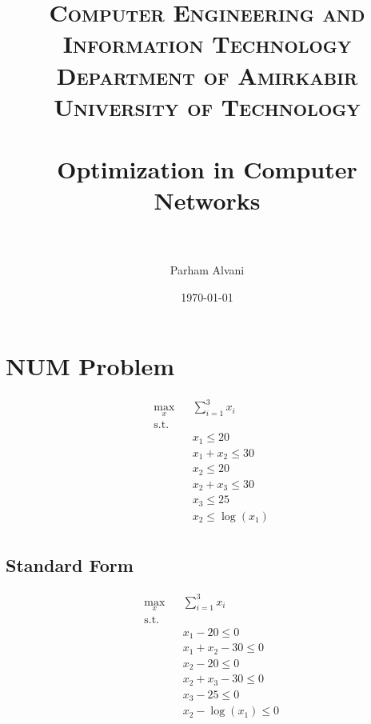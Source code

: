 \documentclass[paper=a4, fontsize=11pt]{scrartcl} %
\title{	
	\normalfont\normalsize
	\textsc{Computer Engineering and Information Technology Department of Amirkabir University of Technology} \\ [25pt] %
	\horrule{0.5pt} \\[0.4cm] %
	\huge Optimization in Computer Networks \\ %
	\horrule{2pt} \\[0.5cm] %
}
\author{Parham Alvani} %
\date{\normalsize\today} %
\numberwithin{equation}{section} %
\numberwithin{figure}{section} %
\numberwithin{table}{section} %
\begin{document}
\maketitle %


\section{NUM Problem}

\begin{equation}
	\begin{aligned}
		& \underset{x}{\text{max}}
		& & \sum_{i=1}^{3} x_i \\
		& \text{s.t.} \\
		& & & x_1 \le 20 \\
		& & & x_1 + x_2 \le 30 \\
		& & & x_2 \le 20 \\
		& & & x_2 + x_3 \le 30 \\
		& & & x_3 \le 25 \\
		& & & x_2 \le \log(x_1) \\
	\end{aligned}					
\end{equation}


\subsection{Standard Form}

\begin{equation}
	\begin{aligned}
		& \underset{x}{\text{max}}
		& & \sum_{i=1}^{3} x_i \\
		& \text{s.t.} \\
		& & & x_1 - 20 \le 0 \\
		& & & x_1 + x_2 - 30 \le 0 \\
		& & & x_2 - 20 \le 0 \\
		& & & x_2 + x_3 - 30 \le 0 \\
		& & & x_3 - 25 \le 0 \\
		& & & x_2 - \log(x_1) \le 0 \\
	\end{aligned}					
\end{equation}
\end{document}
